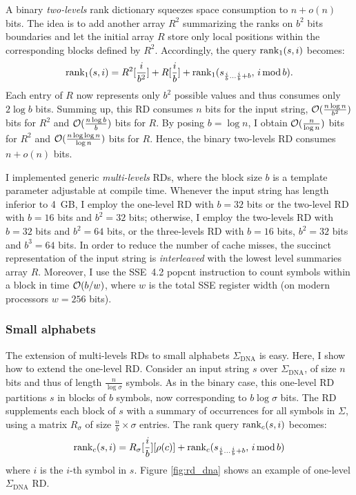A binary \emph{two-levels} rank dictionary squeezes space consumption to $n+o(n)$ bits.
The idea is to add another array $R^2$ summarizing the ranks on $b^2$ bits boundaries and let the initial array $R$ store only local positions within the corresponding blocks defined by $R^2$.
Accordingly, the query $\text{rank}_1(s,i)$ becomes:
\begin{eqnarray}
\rank_1(s,i) = R^2[\frac{i}{b^2}] + R[\frac{i}{b}] + \rank_1(s_{\frac{i}{b} \dots \frac{i}{b}+b}, \, i \imod{b}).
\end{eqnarray}
Each entry of $R$ now represents only $b^2$ possible values and thus consumes only $2\log{b}$ bits.
Summing up, this RD consumes $n$ bits for the input string, $\mathcal{O}(\frac{n \log{n}}{b^2})$ bits for $R^2$ and $\mathcal{O}(\frac{n \log{b}}{b})$ bits for $R$.
By posing $b=\log{n}$, I obtain $\mathcal{O}(\frac{n}{\log{n}})$ bits for $R^2$ and $\mathcal{O}(\frac{n \log{\log{n}}}{\log{n}})$ bits for $R$.
Hence, the binary two-levels RD consumes $n + o(n)$ bits.

I implemented generic \emph{multi-levels} RDs, where the block size $b$ is a template parameter adjustable at compile time.
Whenever the input string has length inferior to 4~GB, I employ the one-level RD with $b = 32$ bits or the two-level RD with $b = 16$ bits and $b^2 = 32$ bits;
otherwise, I employ the two-levels RD with $b = 32$ bits and $b^2 = 64$ bits, or the three-levels RD with $b = 16$ bits, $b^2 = 32$ bits and $b^3 = 64$ bits.
In order to reduce the number of cache misses, the succinct representation of the input string is \emph{interleaved} with the lowest level summaries array $R$.
Moreover, I use the SSE~4.2 popcnt instruction \citep{Intel2011} to count symbols within a block in time $\mathcal{O}(b/w)$, where $w$ is the total SSE register width (on modern processors $w=256$ bits).

\subsubsection{Small alphabets}

The extension of multi-levels RDs to small alphabets \eg $\Sigma_{\text{DNA}}$ is easy.
Here, I show how to extend the one-level RD.
Consider an input string $s$ over $\Sigma_{\text{DNA}}$, of size $n$ bits and thus of length $\frac{n}{\log{\sigma}}$ symbols.
As in the binary case, this one-level RD partitions $s$ in blocks of $b$ symbols, now corresponding to $b \log{\sigma}$ bits.
The RD supplements each block of $s$ with a summary of occurrences for all symbols in $\Sigma$, using a matrix $R_{\sigma}$ of size $\frac{n}{b} \times \sigma$ entries.
The rank query $\text{rank}_c(s,i)$ becomes:
\begin{eqnarray}
\rank_c(s,i) = R_{\sigma}[\frac{i}{b}][\rho(c)] + \rank_c(s_{\frac{i}{b} \dots \frac{i}{b}+b}, \, i\imod{b})
\end{eqnarray}
where $i$ is the $i$-th symbol in $s$.
Figure \ref{fig:rd_dna} shows an example of one-level $\Sigma_{\text{DNA}}$ RD.

